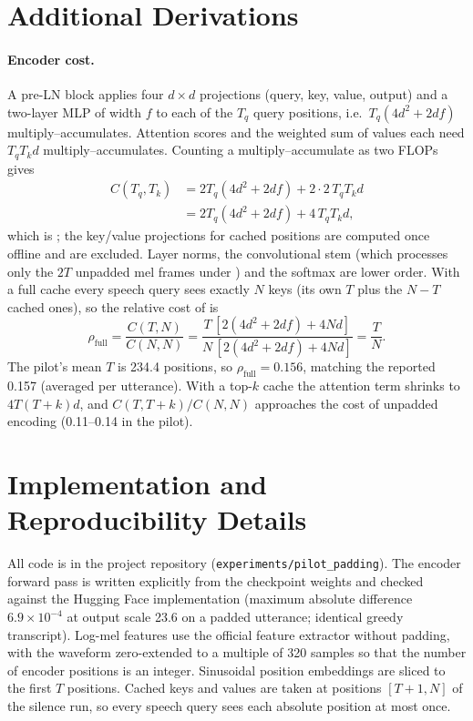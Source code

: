 \section{Additional Derivations}
\label{app:derivations}

\paragraph{Encoder cost.} A pre-LN block applies four $d\times d$ projections (query, key, value, output) and a two-layer MLP of width $f$ to each of the $T_q$ query positions, i.e.\ $T_q(4d^2+2df)$ multiply--accumulates. Attention scores and the weighted sum of values each need $T_qT_kd$ multiply--accumulates. Counting a multiply--accumulate as two FLOPs gives
\begin{align}
    C(T_q,T_k)
    &= 2T_q(4d^2+2df) + 2\cdot 2\,T_qT_kd \\
    &= 2T_q(4d^2+2df) + 4\,T_qT_kd ,
\end{align}
which is ; the key/value projections for cached positions are computed once offline and are excluded. Layer norms, the convolutional stem (which processes only the $2T$ unpadded mel frames under \method{}) and the softmax are lower order. With a full cache every speech query sees exactly $N$ keys (its own $T$ plus the $N-T$ cached ones), so the relative cost of \method{} is
\begin{equation}
    \rho_{\mathrm{full}}=\frac{C(T,N)}{C(N,N)}=\frac{T\,[2(4d^2+2df)+4Nd]}{N\,[2(4d^2+2df)+4Nd]}=\frac{T}{N}.
\end{equation}
The pilot's mean $T$ is 234.4 positions, so $\rho_{\mathrm{full}}=0.156$, matching the reported 0.157 (averaged per utterance). With a top-$k$ cache the attention term shrinks to $4T(T{+}k)d$, and $C(T,T{+}k)/C(N,N)$ approaches the cost of unpadded encoding (0.11--0.14 in the pilot).

\section{Implementation and Reproducibility Details}
\label{app:implementation}

All code is in the project repository (\texttt{experiments/pilot\_padding}). The encoder forward pass is written explicitly from the checkpoint weights and checked against the Hugging Face implementation (maximum absolute difference $6.9\times10^{-4}$ at output scale 23.6 on a padded utterance; identical greedy transcript). Log-mel features use the official feature extractor without padding, with the waveform zero-extended to a multiple of 320 samples so that the number of encoder positions is an integer. Sinusoidal position embeddings are sliced to the first $T$ positions. Cached keys and values are taken at positions $[T{+}1,N]$ of the silence run, so every speech query sees each absolute position at most once.

